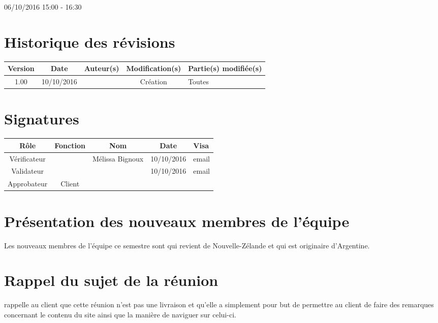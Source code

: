 \documentclass [a4paper] {article}
\begin{document}
06/10/2016			 				%
\hfill   
\hfill 	 15:00 - 16:30 				%


\section*{Historique des révisions}
\begin{center}
			\begin{tabular}{| c | c | c | c | p{4cm} |}
				\hline
				\rowcolor{Gray}
				Version & Date & Auteur(s) & Modification(s) & Partie(s) modifiée(s)		 \\
				\hline
				1.00 & 10/10/2016 & \Julie & Création & Toutes \\
		\hline		
			\end{tabular}
		\end{center}

\section*{Signatures}

		\begin{center}
			\begin{tabular}{| c | c | c | c | p{4cm} |}
				\hline
				\rowcolor{Gray}
				Rôle & Fonction & Nom & Date & Visa		 \\
				\hline
				Vérificateur & \RGC & Mélissa Bignoux & 10/10/2016 & email \\[30pt]
				\hline
				Validateur & \CP & \Pierre & 10/10/2016 & email \\[30pt]	
				\hline
				Approbateur & Client & \nomClient &  &  \\[30pt]	
				\hline
			\end{tabular}
		\end{center}


\section{Présentation des nouveaux membres de l'équipe}
Les nouveaux membres de l'équipe ce semestre sont \Francois{} qui revient de Nouvelle-Zélande et \Juliana{} qui est originaire d'Argentine.

\section{Rappel du sujet de la réunion}
\Pierre{} rappelle au client que cette réunion n'est pas une livraison et qu'elle a simplement pour but de permettre au client de faire des remarques concernant le contenu du site ainsi que la manière de naviguer sur celui-ci.
\end{document}
